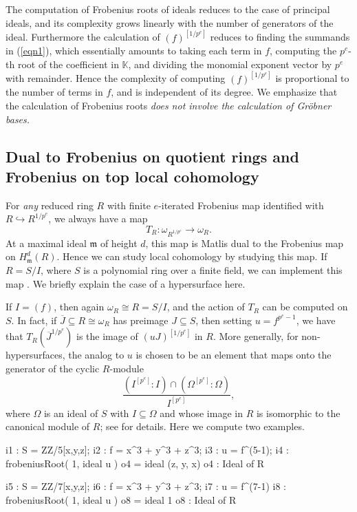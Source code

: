 \documentclass{amsart}
\newcommand{\fram}{\mathfrak{m}}
\begin{document}
The computation of Frobenius roots of ideals reduces to the case of principal ideals, and its complexity grows linearly with the number of generators of the ideal.
Furthermore the calculation of  $(f)^{[1/p^e]}$ reduces to finding the summands in (\ref{eqn1}), which essentially amounts to
taking each term in $f$, computing the $p^e$-th root of the coefficient in $\mathbb{K}$, and dividing the monomial exponent vector by $p^e$ with remainder.
Hence the complexity of computing $(f)^{[1/p^e]}$ is proportional to the number of terms in $f$, and is independent of its degree.
We emphasize that the calculation of Frobenius roots \emph{does not involve the calculation of Gr\"obner bases.}

\subsection{Dual to Frobenius on quotient rings and Frobenius on top local cohomology}
\label{subsec.DualToFrobeniusOnQuotientRings}
For \emph{any} reduced ring $R$ with finite $e$-iterated Frobenius map identified with $R \hookrightarrow R^{1/p^e}$, we always have a map
\[
T_R : \omega_{R^{1/p^e}} \to \omega_R.
\]
At a maximal ideal $\fram$ of height $d$, this map is Matlis dual to the Frobenius map on $H^d_{\fram}(R)$.
Hence we can study local cohomology by studying this map.
If $R = S/I$, where $S$ is a polynomial ring over a finite field, we can implement this map \cite{FedderFPureRat, KatzmanParameterTestIdealOfCMRings}.  We briefly explain the case of a hypersurface here.

If $I = (f)$, then again $\omega_R \cong R = S/I$, and the action of $T_R$ can be computed on $S$.  In fact, if $\overline{J} \subseteq R \cong \omega_R$ has preimage  $J \subseteq S$,
then setting $u = f^{p^e-1}$, we have that $T_R({\overline J}^{1/p^e})$ is the image of $(u J)^{[1/p^e]}$ in $R$.
More generally, for non-hypersurfaces, the analog to $u$ is chosen to be an element that maps onto the generator of the cyclic $R$-module 
\[
\frac{(I^{[p^e]} : I) \cap (\Omega^{[p^e]} : \Omega)}{ I^{[p^e]}},
\]
where $\Omega$ is an ideal of $S$ with $I\subseteq \Omega$ and whose image in $R$ is isomorphic to the canonical module of $R$; see \cite{KatzmanParameterTestIdealOfCMRings} for details.
Here we compute two examples.

\medskip
{\small
\begin{MyVerbatim}
i1 : S = ZZ/5[x,y,z];
i2 : f = x^3 + y^3 + z^3;
i3 : u = f^(5-1);
i4 : frobeniusRoot( 1, ideal u )
o4 = ideal (z, y, x)
o4 : Ideal of R

i5 : S = ZZ/7[x,y,z];
i6 : f = x^3 + y^3 + z^3;
i7 : u = f^(7-1)
i8 : frobeniusRoot( 1, ideal u )
o8 = ideal 1
o8 : Ideal of R
\end{MyVerbatim}
}\medskip
\end{document}
